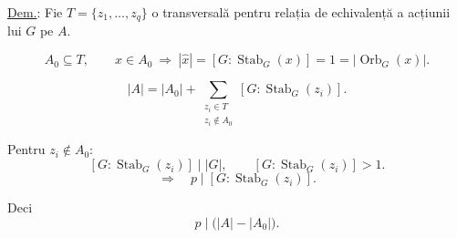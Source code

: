 \bigskip
\noindent\underline{Dem.}: Fie $T=\{z_1,\ldots,z_q\}$
o transversală pentru relația de echivalență a acțiunii lui $G$ pe $A$.

\[
A_0\subseteq T,\qquad
x\in A_0\ \Longrightarrow\
|\widehat{x}|=[G:\operatorname{Stab}_G(x)]=1
=|\operatorname{Orb}_G(x)|.
\]

\[
|A|=|A_0|+
\sum_{\substack{z_i\in T\\z_i\notin A_0}}
[G:\operatorname{Stab}_G(z_i)].
\]

\noindent Pentru $z_i\notin A_0$:
\[
[G:\operatorname{Stab}_G(z_i)]\mid |G|,
\qquad [G:\operatorname{Stab}_G(z_i)]>1.
\]
\[
\Longrightarrow\quad p\mid[G:\operatorname{Stab}_G(z_i)].
\]

\noindent Deci
\[
p\mid\bigl(|A|-|A_0|\bigr).
\]
